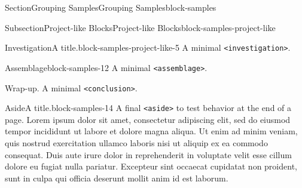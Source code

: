 \documentclass[twoside,10pt,]{article}
\newcommand{\mono}[1]{\texttt{#1}}
\numberwithin{equation}{section}
\begin{document}
\begin{sectionptx}{Section}{Grouping Samples}{}{Grouping Samples}{}{}{block-samples}
\begin{subsectionptx}{Subsection}{Project-like Blocks}{}{Project-like Blocks}{}{}{block-samples-project-like}
\begin{investigation}{Investigation}{A title.}{block-samples-project-like-5}
A minimal \mono{<investigation>}.%
\end{investigation}%
\end{subsectionptx}
\begin{assemblage}{Assemblage}{}{block-samples-12}%
A minimal \mono{<assemblage>}.%
\end{assemblage}
\begin{conclusion}{Wrap-up.}%
A minimal \mono{<conclusion>}.%
\end{conclusion}%
\begin{aside}{Aside}{A title.}{block-samples-14}%
A final \mono{<aside>} to test behavior at the end of a page. Lorem ipsum dolor sit amet, consectetur adipiscing elit, sed do eiusmod tempor incididunt ut labore et dolore magna aliqua. Ut enim ad minim veniam, quis nostrud exercitation ullamco laboris nisi ut aliquip ex ea commodo consequat. Duis aute irure dolor in reprehenderit in voluptate velit esse cillum dolore eu fugiat nulla pariatur. Excepteur sint occaecat cupidatat non proident, sunt in culpa qui officia deserunt mollit anim id est laborum.%
\end{aside}
\end{sectionptx}
%
%
\typeout{************************************************}
\typeout{************************************************}
%
\end{document}
